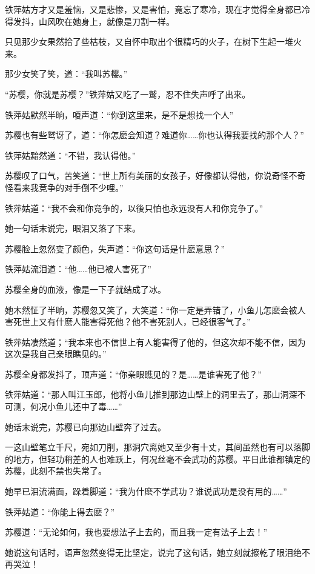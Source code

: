 \documentclass[12pt,oneside]{book}
\begin{document}
铁萍姑方才又是羞恼，又是悲惨，又是害怕，竟忘了寒冷，现在才觉得全身都已冷得发抖，山风吹在她身上，就像是刀割一样。

只见那少女果然拾了些枯枝，又自怀中取出个很精巧的火子，在树下生起一堆火来。

那少女笑了笑，道：``我叫苏樱。''

``苏樱，你就是苏樱？''铁萍姑又吃了一鹫，忍不住失声呼了出来。

铁萍姑默然半晌，嗄声道：``你到这里来，是不是想找一个人''

苏樱也有些鹫讶了，道：``你怎麽会知道？难道你\ldots\ldots 你也认得我要找的那个人？''

铁萍姑黯然道：``不错，我认得他。''

苏樱叹了口气，苦笑道：``世上所有美丽的女孩子，好像都认得他，你说奇怪不奇怪看来我竞争的对手倒不少哩。''

铁萍姑道：``我不会和你竞争的，以後只怕也永远没有人和你竞争了。''

她一句话末说完，眼泪又落了下来。

苏樱脸上忽然变了颜色，失声道：``你这句话是什麽意思？''

铁萍姑流泪道：``他\ldots\ldots 他已被人害死了''

苏樱全身的血液，像是一下子就结成了冰。

她木然怔了半晌，苏樱忽又笑了，大笑道：``你一定是弄错了，小鱼儿怎麽会被人害死世上又有什麽人能害得死他？他不害死别人，已经很客气了。''

铁萍姑凄然道；``我本来也不信世上有人能害得了他的，但这次却不能不信，因为这次是我自己亲眼瞧见的。''

苏樱全身都发抖了，顶声道：``你亲眼瞧见的？是\ldots\ldots 是谁害死了他？''

铁萍姑道：``那人叫江玉郎，他将小鱼儿推到那边山壁上的洞里去了，那山洞深不可测，何况小鱼儿还中了毒\ldots\ldots{}''

她话末说完，苏樱已向那边山壁奔了过去。

一这山壁笔立千尺，宛如刀削，那洞穴离她又至少有十丈，其间虽然也有可以落脚的地方，但轻功稍差的人也难跃上，何况丝毫不会武功的苏樱。平日此谁都镇定的苏樱，此刻不禁也失常了。

她早已泪流满面，跺着脚道：``我为什麽不学武功？谁说武功是没有用的\ldots\ldots{}''

铁萍姑道：``你能上得去麽？''

苏樱道：``无论如何，我也要想法子上去的，而且我一定有法子上去！''

她说这句话时，语声忽然变得无比坚定，说完了这句话，她立刻就擦乾了眼泪绝不再哭泣！
\end{document}
